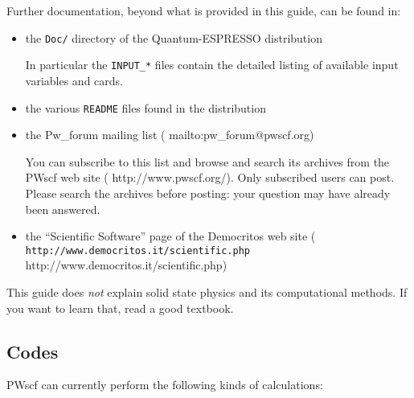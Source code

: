 \documentclass[12pt,a4paper]{article}
\begin{document}
Further documentation, beyond what is provided in this guide, can be
found in:
\begin{itemize}
  \item the \texttt{Doc/} directory of the Quantum-ESPRESSO distribution

        In particular the \texttt{INPUT\_*} files contain the detailed
        listing of available input variables and cards.
  \item the various \texttt{README} files found in the distribution
  \item the Pw\_forum mailing list
        (%
                           {mailto:pw_forum@pwscf.org})

        You can subscribe to this list and browse and search its
        archives from the PWscf web site
        (%
                           {http://www.pwscf.org/}).
        Only subscribed users can post.
        Please search the archives before posting: your question may
        have already been answered.
  \item the ``Scientific Software'' page of the Democritos web site
        \hfill\break
        (\htmladdnormallink%
         {\texttt{http://www.democritos.it/scientific.php}}%
         {http://www.democritos.it/scientific.php})
\end{itemize}
%
This guide does \emph{not} explain solid state physics and its
computational methods.
If you want to learn that, read a good textbook.

\subsection{Codes}

PWscf can currently perform the following kinds of calculations:
\end{document}
